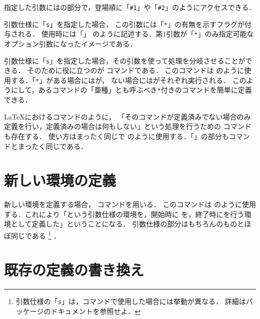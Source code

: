 指定した引数にはの部分で，登場順に「\lstinline|#1|」や「\lstinline|#2|」のようにアクセスできる．

引数仕様に「\lstinline|s|」を指定した場合，
この引数には「\lstinline|*|」の有無を示すフラグが付与される．
使用時には「\cs{}\cmd{*}」
のように記述する．第1引数が「\lstinline|*|」のみ指定可能なオプション引数になったイメージである．

引数仕様に「\lstinline|s|」を指定した場合，その引数を使って処理を分岐させることができる．
そのために役に立つのが
%
%
コマンドである．
このコマンドは
のように使用する．「\lstinline|*|」がある場合にはが，
ない場合にはがそれぞれ実行される．
このようにして，あるコマンドの「亜種」とも呼ぶべき\lstinline|*|付きのコマンドを簡単に定義できる．

{\LaTeX}におけるコマンドのように，
「そのコマンドが定義済みでない場合のみ定義を行い，定義済みの場合は何もしない」という処理を行うための
%
%
コマンドも存在する．
使い方はまったく同じで
のように使用する．「」の部分もコマンドとまったく同じである．

\section{新しい環境の定義} \label{sec:defenv}

新しい環境を定義する場合，
%
%
コマンドを用いる．
このコマンドは
のように使用する．これにより「という引数仕様の環境を，開始時に
を，終了時にを行う環境として定義した」ということになる．
引数仕様の部分はもちろんのものとほぼ同じである%
\footnote{%
引数仕様の「\lstinline|s|」は，コマンドで使用した場合には挙動が異なる．
詳細はパッケージのドキュメントを参照せよ．
}%
．


\section{既存の定義の書き換え} \label{sec:renew}

